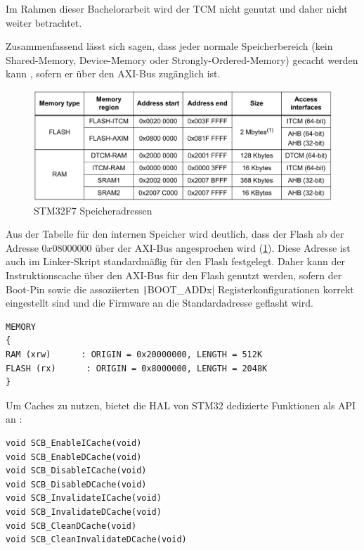 Im Rahmen dieser Bachelorarbeit wird der TCM nicht genutzt und daher nicht
weiter betrachtet.

Zusammenfassend lässt sich sagen, dass jeder normale Speicherbereich (kein
Shared-Memory, Device-Memory oder Strongly-Ordered-Memory) gecacht werden kann
\cite[S. 7]{an4667}, sofern er über den AXI-Bus zugänglich ist.

\begin{figure}[htb]
    \centering
    \includegraphics[width=1\textwidth]{assets/internal_mem_table}
    \caption{STM32F7 Speicheradressen \cite[S. 14]{an4667}}
    \label{fig:internal_mem_table}
\end{figure}

Aus der Tabelle für den internen Speicher wird deutlich, dass der Flash ab der
Adresse $0x0800 0000$ über der AXI-Bus angesprochen wird
(\ref{fig:internal_mem_table}). Diese Adresse ist auch im Linker-Skript
standardmäßig für den Flash festgelegt. Daher kann der Instruktionscache über
den AXI-Bus für den Flash genutzt werden, sofern der Boot-Pin sowie die
assoziierten \texttt|BOOT_ADDx| Registerkonfigurationen korrekt
eingestellt sind \cite[S. 28]{stm32_datasheet} und die Firmware an die
Standardadresse geflasht wird.

\begin{code}
\begin{verbatim}
MEMORY
{
RAM (xrw)      : ORIGIN = 0x20000000, LENGTH = 512K
FLASH (rx)      : ORIGIN = 0x8000000, LENGTH = 2048K
}
\end{verbatim}
\end{code}

Um Caches zu nutzen, bietet die \ac{HAL} von STM32 dedizierte Funktionen als API
an \cite[S. 4]{an4839}:

\begin{code}
\begin{verbatim}
void SCB_EnableICache(void)
void SCB_EnableDCache(void)
void SCB_DisableICache(void)
void SCB_DisableDCache(void)
void SCB_InvalidateICache(void)
void SCB_InvalidateDCache(void)
void SCB_CleanDCache(void)
void SCB_CleanInvalidateDCache(void)
\end{verbatim}
\end{code}

